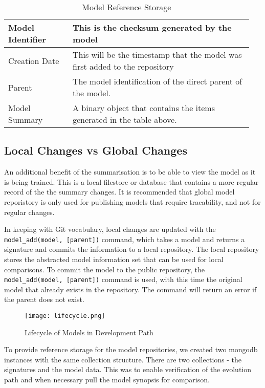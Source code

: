 \begin{table}[h]
\caption{Model Reference Storage}

\begin{tabular}{| p{0.25\linewidth} | p{0.7\linewidth} |}
    \hline
    Model Identifier    & This is the checksum generated by the model \\
    \hline
    Creation Date       & This will be the timestamp that the model was first added to the repository \\
    \hline
    Parent              & The model identification of the direct parent of the model. \\
    \hline
    Model Summary       & A binary object that contains the items generated in the table above. \\
    \hline 
    
\end{tabular}
\end{table}

\subsection{Local Changes vs Global Changes}

An additional benefit of the summarisation is to be able to view the model as it is being trained. This is a local filestore or database that contains a more regular record of the the summary changes. It is recommended that global model reporistory is only used for publishing models that require tracability, and not for regular changes.

In keeping with Git vocabulary, local changes are updated with the \verb|model_add(model, [parent])| command, which takes a model and returns a signature and commits the information to a local repository. The local repository stores the abstracted model information set that can be used for local comparisons.
To commit the model to the public repository, the \verb|model_add(model, [parent])| command is used, with this time the original model that already exists in the repository. The command will return an error if the parent does not exist.


\begin{figure}[!t]
    \centering
    \texttt{[image: lifecycle.png]}
    \caption{Lifecycle of Models in Development Path}
    \label{fig_sim}
\end{figure}

To provide reference storage for the model repositories, we created two mongodb instances with the same collection structure. There are two collections - the signatures and the model data. This was to enable verification of the evolution path and when necessary pull the model synopsis for comparison.

